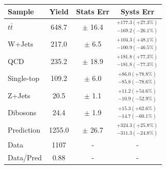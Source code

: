 \documentclass{beamer}
\newcommand*{\header}[1]{\fontsize{16}{8}\selectfont \textbf{{\color{MyPurple}{#1}}}}
\begin{document}
\begin{frame}
\begin{center}
\header{Boosted SR}
\end{center}
\begin{table}
\begin{center}
\tiny
\begin{tabular}{l|c|c|c}
Sample        &    Yield &  Stats Err &   Systs Err \\
\hline
$t\bar{t}$    &  648.7   & $\pm$ 16.4    & $^{+177.3(+27.3\%)}_{-169.2(-26.1\%)}$ \\
W+Jets        &  217.0   & $\pm$ 6.5     & $^{+104.3(+48.1\%)}_{-100.9(-46.5\%)}$ \\
QCD           &  235.2   & $\pm$ 18.9    & $^{+181.8(+77.3\%)}_{-181.8(-77.3\%)}$ \\
Single-top    &  109.2   & $\pm$ 6.0     & $^{+86.0(+78.8\%)}_{-85.8(-78.6\%)}$ \\
Z+Jets        &  20.5    & $\pm$ 1.1     & $^{+11.2(+54.6\%)}_{-10.9(-52.9\%)}$ \\
Dibosons      &  24.4    & $\pm$ 1.9     & $^{+15.3(+62.6\%)}_{-14.7(-60.1\%)}$ \\
\hline
Prediction    &  1255.0  & $\pm$ 26.7    & $^{+324.3(+25.8\%)}_{-311.3(-24.8\%)}$ \\
Data          &  1107    & - & - \\
\hline
Data/Pred     &  0.88    & - & - \\
\hline
\end{tabular}
\end{center}
\end{table}
\end{frame}
\end{document}
